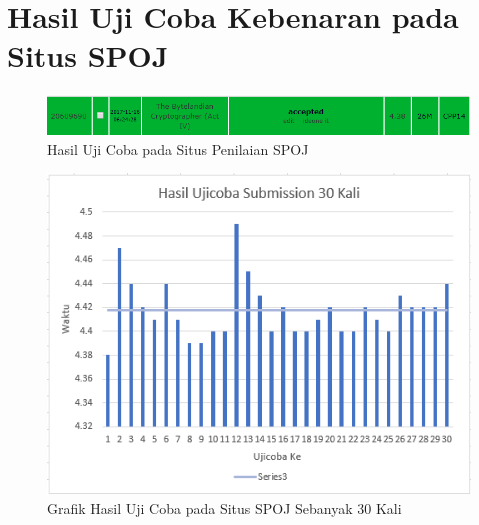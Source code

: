 
 \chapter{Hasil Uji Coba Kebenaran pada Situs SPOJ}
   
   \begin{figure}[H]
   \centering
  	\includegraphics[scale=0.5]{images/lampiran/best.png}
  	\caption{Hasil Uji Coba pada Situs Penilaian SPOJ}
  	\label{fig:best_submission}
  	\end{figure}
	
	 \begin{figure}[H]
  \centering
  	 \includegraphics[scale=0.7]{images/lampiran/uji31.png}
  	\caption{Grafik Hasil Uji Coba pada Situs SPOJ Sebanyak 30 Kali}
  	\label{fig:chart}
  \end{figure}  	
  	
